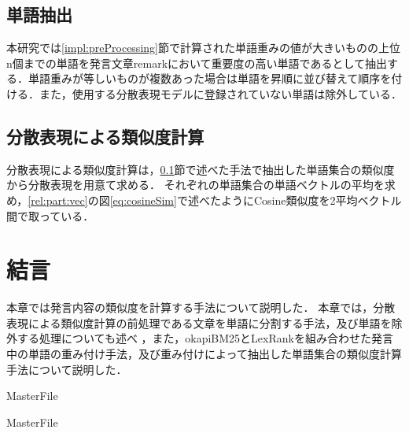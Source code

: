 \subsection{単語抽出}
\label{impl:similarity:extract}
本研究では\ref{impl:preProcessing}節で計算された単語重みの値が大きいものの上位n個までの単語を発言文章remarkにおいて重要度の高い単語であるとして抽出する．単語重みが等しいものが複数あった場合は単語を昇順に並び替えて順序を付ける．また，使用する分散表現モデルに登録されていない単語は除外している．
\subsection{分散表現による類似度計算}
\label{impl:similarity:wordEmbed}
分散表現による類似度計算は，\ref{impl:similarity:extract}節で述べた手法で抽出した単語集合の類似度から分散表現を用意て求める．
それぞれの単語集合の単語ベクトルの平均を求め，\ref{rel:part:vec}の図\ref{eq:cosineSim}で述べたようにCosine類似度を2平均ベクトル間で取っている．
\section{結言}
\label{impl:conclusion}
本章では発言内容の類似度を計算する手法について説明した．
本章では，分散表現による類似度計算の前処理である文章を単語に分割する手法，及び単語を除外する処理についても述べ ，また，okapiBM25とLexRankを組み合わせた発言中の単語の重み付け手法，及び重み付けによって抽出した単語集合の類似度計算手法について説明した．

 \expandafter\ifx\csname MasterFile\endcsname\relax
	\def\BibFile{hoge}
	
  \fi
  \expandafter\ifx\csname MasterFile\endcsname\relax
  
  \fi

